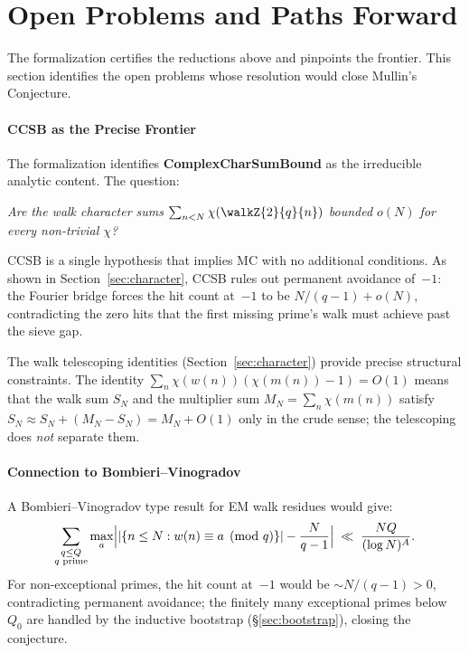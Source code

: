\section{Open Problems and Paths Forward}
\label{sec:open}

The formalization certifies the reductions above and pinpoints the
frontier.  This section identifies the open problems whose resolution
would close Mullin's Conjecture.

\paragraph{CCSB as the Precise Frontier}

The formalization identifies \textbf{ComplexCharSumBound} as the
irreducible analytic content.  The question:

\begin{center}
\emph{Are the walk character sums $\sum_{n<N} \chi(\walkZ{2}{q}{n})$ bounded
$o(N)$ for every non-trivial $\chi$?}
\end{center}

CCSB is a single hypothesis that implies MC with no additional
conditions.  As shown in Section~\ref{sec:character}, CCSB rules out
permanent avoidance of~$-1$: the Fourier bridge forces the hit count
at~$-1$ to be $N/(q{-}1) + o(N)$, contradicting the zero hits that
the first missing prime's walk must achieve past the sieve gap.

The walk telescoping identities (Section~\ref{sec:character}) provide
precise structural constraints.  The identity
$\sum_n \chi(w(n))(\chi(m(n))-1) = O(1)$ means that the walk sum
$S_N$ and the multiplier sum $M_N = \sum_n \chi(m(n))$ satisfy
$S_N \approx S_N + (M_N - S_N) = M_N + O(1)$ only in the crude sense;
the telescoping does \emph{not} separate them.

\paragraph{Connection to Bombieri--Vinogradov}

A Bombieri--Vinogradov type result for EM walk residues would give:
\[
\sum_{\substack{q \leq Q \\ q\text{ prime}}}
\max_{a}
\Bigl| |\{n \leq N : w(n) \equiv a \pmod{q}\}|
  - \frac{N}{q-1} \Bigr|
\;\ll\; \frac{NQ}{(\log N)^A}.
\]
For non-exceptional primes, the hit count at~$-1$ would be
$\sim N/(q{-}1) > 0$, contradicting permanent avoidance; the finitely
many exceptional primes below~$Q_0$ are handled by the inductive
bootstrap (\S\ref{sec:bootstrap}), closing the conjecture.

